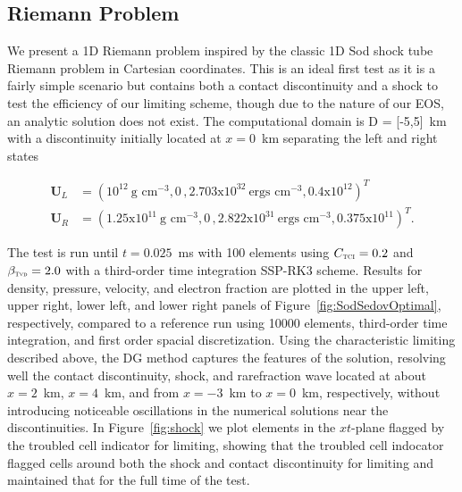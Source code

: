 \documentclass[onecolumn]{aastex62}
\newcommand{\TVD}{\textnormal{\tiny\textsc{Tvd}}}
\newcommand{\TCI}{\textnormal{\tiny\textsc{TCI}}}
\begin{document}
\subsection{Riemann Problem}
\label{sec:results:1}
We present a 1D Riemann problem inspired by the classic 1D Sod shock tube Riemann problem \citep{sod:1978} in
Cartesian coordinates. This is an ideal first test as it is a fairly simple
scenario but contains both a contact discontinuity and a shock to test the
efficiency of our limiting scheme, though due to the nature of our EOS, an analytic
solution does not exist. The computational domain is D = [-5,5]~km
with a discontinuity initially located at $x = 0$~km separating the left and right states

\begin{align*}
  \mathbf{U}_{L} &= (10^{12}~\text{g~cm}^{-3}, 0\,, 2.703\text{x}10^{32}~\text{ergs~cm}^{-3}, 0.4\text{x}10^{12})^T\,\,\, \\
  \mathbf{U}_{R} &= (1.25\text{x}10^{11}~\text{g~cm}^{-3}, 0\, , 2.822\text{x}10^{31}~\text{ergs~cm}^{-3}, 0.375\text{x}10^{11})^T.
\end{align*}

\noindent The test is run until $t = 0.025$~ms with 100 elements
using $C_{\TCI} = 0.2$ and $\beta_{\TVD} = 2.0$ with a third-order time
integration SSP-RK3 scheme. Results for density, pressure, velocity, and electron fraction
are plotted in the upper left, upper right, lower left, and lower right panels of
Figure~\ref{fig:SodSedovOptimal}, respectively, compared to a reference run using
10000 elements, third-order time integration, and first order spacial discretization.
Using the characteristic limiting described
above, the DG method captures the features of the solution,
resolving well the contact discontinuity, shock, and rarefraction wave
located at about $x=2$~km, $x=4$~km, and from $x=-3$~km to $x=0$~km, respectively, without introducing
noticeable oscillations in the numerical solutions near the discontinuities.
In Figure~\ref{fig:shock}
we plot elements in the $xt$-plane flagged by the troubled cell indicator for
limiting, showing that the troubled cell indocator flagged cells around both
the shock and contact discontinuity for limiting and maintained that
for the full time of the test.
\end{document}
